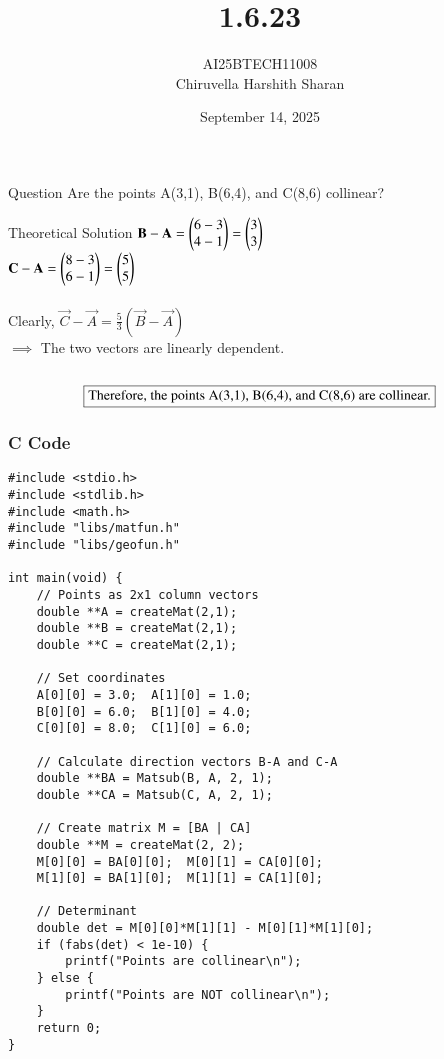 \documentclass{beamer}
\title
{1.6.23}
\date{September 14, 2025}
\author 
{AI25BTECH11008\\Chiruvella Harshith Sharan}
\begin{document}
\frame{\titlepage}

\begin{frame}{Question}
\centering
Are the points A(3,1), B(6,4), and C(8,6) collinear?
\end{frame}

\begin{frame}{Theoretical Solution}
$\mathbf{B}-\mathbf{A}=\begin{pmatrix}6-3 \\ 4-1\end{pmatrix} = \begin{pmatrix}3 \\ 3\end{pmatrix}$ \\
$\mathbf{C}-\mathbf{A}=\begin{pmatrix}8-3 \\ 6-1\end{pmatrix} = \begin{pmatrix}5 \\ 5\end{pmatrix}$ \\\\

Clearly, $\vec{C}-\vec{A} = \tfrac{5}{3}(\vec{B}-\vec{A})$ \\
$\implies$ The two vectors are linearly dependent. \\\\

\begin{align}
\centering
\boxed{\text{Therefore, the points A(3,1), B(6,4), and C(8,6) are collinear.}}
\end{align}
\end{frame}

\begin{frame}[fragile]
    \frametitle{C Code}
    \begin{lstlisting}
#include <stdio.h>
#include <stdlib.h>
#include <math.h>
#include "libs/matfun.h"
#include "libs/geofun.h"

int main(void) {
    // Points as 2x1 column vectors
    double **A = createMat(2,1);
    double **B = createMat(2,1);
    double **C = createMat(2,1);

    // Set coordinates
    A[0][0] = 3.0;  A[1][0] = 1.0;
    B[0][0] = 6.0;  B[1][0] = 4.0;
    C[0][0] = 8.0;  C[1][0] = 6.0;

    // Calculate direction vectors B-A and C-A
    double **BA = Matsub(B, A, 2, 1);
    double **CA = Matsub(C, A, 2, 1);

    // Create matrix M = [BA | CA]
    double **M = createMat(2, 2);
    M[0][0] = BA[0][0];  M[0][1] = CA[0][0];
    M[1][0] = BA[1][0];  M[1][1] = CA[1][0];

    // Determinant
    double det = M[0][0]*M[1][1] - M[0][1]*M[1][0];
    if (fabs(det) < 1e-10) {
        printf("Points are collinear\n");
    } else {
        printf("Points are NOT collinear\n");
    }
    return 0;
}
    \end{lstlisting}
\end{frame}
\end{document}

